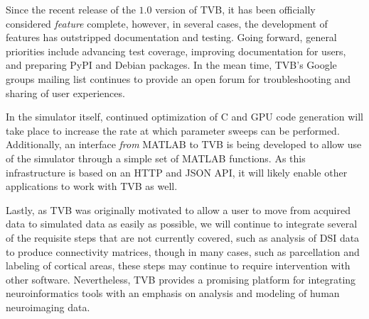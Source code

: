 
Since the recent release of the $1.0$ version of TVB, it has been 
officially considered \textit{feature} complete, however, in several
cases, the development of features has outstripped documentation 
and testing. Going forward, general priorities include
advancing test coverage, improving documentation for users, and
preparing PyPI and Debian packages. In the mean
time, TVB's Google groups mailing list continues to
provide an open forum for troubleshooting and sharing of user experiences.

In the simulator itself, continued optimization of C and GPU code generation
will take place to increase the rate at which parameter sweeps can be
performed. Additionally, an interface \textit{from} MATLAB to TVB 
is being developed to allow use of the simulator through a simple
set of MATLAB functions. As this infrastructure is based on an HTTP and 
JSON API, it will likely enable other applications to work with TVB as well.

Lastly, as TVB was originally motivated to allow a user to move from
acquired data to simulated data as easily as possible, we will continue
to integrate several of the requisite steps that are not currently 
covered, such as analysis of DSI data to produce connectivity matrices,
though in many cases, such as parcellation and labeling of 
cortical areas, these steps may continue to require 
intervention with other software. Nevertheless, TVB provides a promising 
platform for integrating 
neuroinformatics tools with an emphasis on analysis and modeling of 
human neuroimaging data.


